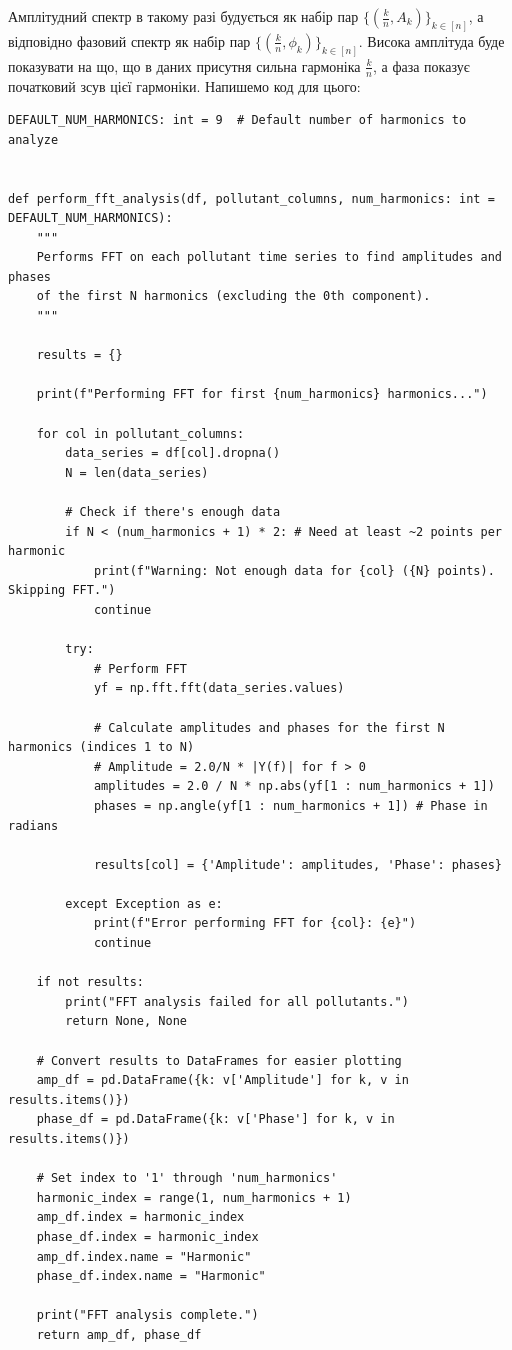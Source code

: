 \documentclass{exam_template}
\begin{document}
Амплітудний спектр в такому разі будується як набір пар $\{\left(\frac{k}{n},
A_k\right)\}_{k \in [n]}$, а відповідно фазовий спектр як набір пар
$\{\left(\frac{k}{n}, \phi_k\right)\}_{k \in [n]}$. Висока амплітуда буде
показувати на що, що в даних присутня сильна гармоніка $\frac{k}{n}$, а фаза
показує початковий зсув цієї гармоніки. Напишемо код для цього:
\begin{verbatim}
DEFAULT_NUM_HARMONICS: int = 9  # Default number of harmonics to analyze


def perform_fft_analysis(df, pollutant_columns, num_harmonics: int = DEFAULT_NUM_HARMONICS):
    """
    Performs FFT on each pollutant time series to find amplitudes and phases
    of the first N harmonics (excluding the 0th component).
    """
    
    results = {}

    print(f"Performing FFT for first {num_harmonics} harmonics...")

    for col in pollutant_columns:
        data_series = df[col].dropna()
        N = len(data_series)

        # Check if there's enough data
        if N < (num_harmonics + 1) * 2: # Need at least ~2 points per harmonic
            print(f"Warning: Not enough data for {col} ({N} points). Skipping FFT.")
            continue

        try:
            # Perform FFT
            yf = np.fft.fft(data_series.values)

            # Calculate amplitudes and phases for the first N harmonics (indices 1 to N)
            # Amplitude = 2.0/N * |Y(f)| for f > 0
            amplitudes = 2.0 / N * np.abs(yf[1 : num_harmonics + 1])
            phases = np.angle(yf[1 : num_harmonics + 1]) # Phase in radians

            results[col] = {'Amplitude': amplitudes, 'Phase': phases}

        except Exception as e:
            print(f"Error performing FFT for {col}: {e}")
            continue

    if not results:
        print("FFT analysis failed for all pollutants.")
        return None, None

    # Convert results to DataFrames for easier plotting
    amp_df = pd.DataFrame({k: v['Amplitude'] for k, v in results.items()})
    phase_df = pd.DataFrame({k: v['Phase'] for k, v in results.items()})

    # Set index to '1' through 'num_harmonics'
    harmonic_index = range(1, num_harmonics + 1)
    amp_df.index = harmonic_index
    phase_df.index = harmonic_index
    amp_df.index.name = "Harmonic"
    phase_df.index.name = "Harmonic"

    print("FFT analysis complete.")
    return amp_df, phase_df
\end{verbatim}
\end{document}

